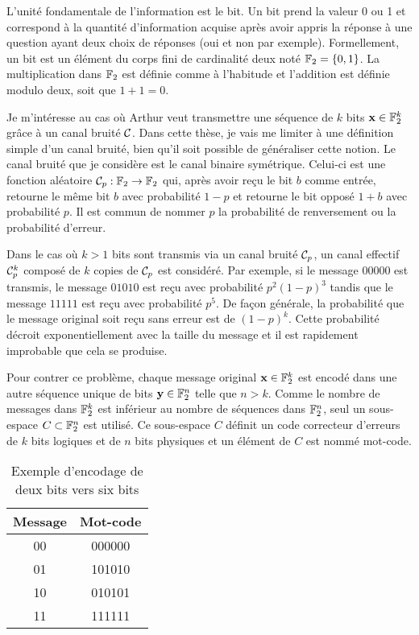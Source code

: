 L'unité fondamentale de l'information est le bit.
Un bit prend la valeur 0 ou 1 et correspond à la quantité 
d'information acquise après avoir appris la réponse 
à une question ayant deux choix de réponses (oui et non par exemple).
Formellement, un bit est un élément du corps fini de cardinalité deux noté $\mathbb{F}_{2} = \qty{0, 1}$.
La multiplication dans $\mathbb{F}_{2}$ est définie comme à l'habitude
et l'addition est définie modulo deux, soit que $1 + 1 = 0$.

Je m'intéresse au cas où Arthur veut transmettre une séquence 
de $k$ bits $\vb{x} \in \mathbb{F}_{2}^k$ grâce à un canal bruité $\mathcal{C}$.
Dans cette thèse,
je vais me limiter à une définition simple d'un canal bruité,
bien qu'il soit possible de généraliser cette notion. 
Le canal bruité que je considère est le canal binaire symétrique.
Celui-ci est une fonction aléatoire $\mathcal {\mathcal{C}}_p: \mathbb{F}_{2} \to \mathbb{F}_{2}$
qui, après avoir reçu le bit $b$ comme entrée, 
retourne le même bit $b$ avec probabilité $1 - p$ et retourne le
bit opposé $1 + b$ avec probabilité $p$.
Il est commun de nommer $p$ la probabilité de renversement 
ou la probabilité d'erreur.

Dans le cas où $k > 1$ bits sont transmis via un canal bruité $\mathcal{C}_p$,
un canal effectif $\mathcal{C}_p^k$ composé de $k$ copies de $\mathcal{C}_p$
est considéré.
Par exemple,
si le message $00000$ est transmis,
le message $01010$ est reçu avec probabilité $p^2(1 - p)^3$ 
tandis que le message $11111$ est reçu avec probabilité $p^5$.
De façon générale, 
la probabilité que le message original soit reçu sans erreur est de $(1 - p)^k$.
Cette probabilité décroit exponentiellement avec la taille du message 
et il est rapidement improbable que cela se produise.

Pour contrer ce problème,
chaque message original $\vb x \in \mathbb{F}_{2}^k$ est encodé dans une autre séquence 
unique de bits $\vb{y} \in \mathbb{F}_{2}^n$ telle que $n > k$.
Comme le nombre de messages dans $\mathbb{F}_{2}^k$ est inférieur au nombre
de séquences dans $\mathbb{F}_{2}^n$,
seul un sous-espace $C \subset \mathbb{F}_{2}^n$ est utilisé.
Ce sous-espace $C$ définit un code correcteur d'erreurs
de $k$ bits logiques et de $n$ bits physiques 
et un élément de $C$ est nommé mot-code.

\begin{table}[t]
  \caption{Exemple d'encodage de deux bits vers six bits}
  \label{tab:exemple_encodage}
  \begin{center}
    \begin{tabular}[c]{cc}
      \textbf{Message} & \textbf{Mot-code} \\
      \hline
      00 & 000000 \\
      01 & 101010 \\
      10 & 010101 \\
      11 & 111111
    \end{tabular}
  \end{center}
\end{table}

